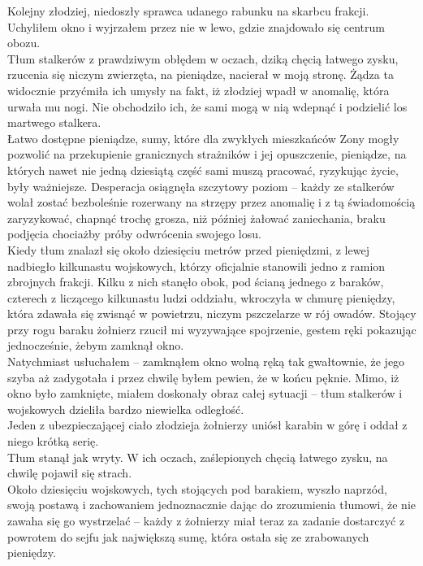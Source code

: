 \documentclass[../MAIN.tex]{subfiles}
\begin{document}
Kolejny złodziej, niedoszły sprawca udanego rabunku na skarbcu frakcji.\\
Uchyliłem okno i wyjrzałem przez nie w lewo, gdzie znajdowało się centrum obozu.\\
Tłum stalkerów z prawdziwym obłędem w oczach, dziką chęcią łatwego zysku, rzucenia się niczym zwierzęta, na pieniądze, nacierał w moją stronę. Żądza ta widocznie przyćmiła ich umysły na fakt, iż złodziej wpadł w anomalię, która urwała mu nogi. Nie obchodziło ich, że sami mogą w nią wdepnąć i podzielić los martwego stalkera.\\
Łatwo dostępne pieniądze, sumy, które dla zwykłych mieszkańców Zony mogły pozwolić na przekupienie granicznych strażników i jej opuszczenie, pieniądze, na których nawet nie jedną dziesiątą część sami muszą pracować, ryzykując życie, były ważniejsze. Desperacja osiągnęła szczytowy poziom -- każdy ze stalkerów wolał zostać bezboleśnie rozerwany na strzępy przez anomalię i z tą świadomością zaryzykować, chapnąć trochę grosza, niż później żałować zaniechania, braku podjęcia chociażby próby odwrócenia swojego losu.\\
Kiedy tłum znalazł się około dziesięciu metrów przed pieniędzmi, z lewej nadbiegło kilkunastu wojskowych, którzy oficjalnie stanowili jedno z ramion zbrojnych frakcji. Kilku z nich stanęło obok, pod ścianą jednego z baraków, czterech z liczącego kilkunastu ludzi oddziału, wkroczyła w chmurę pieniędzy, która zdawała się zwisnąć w powietrzu, niczym pszczelarze w rój owadów. Stojący przy rogu baraku żołnierz rzucił mi wyzywające spojrzenie, gestem ręki pokazując jednocześnie, żebym zamknął okno.\\
Natychmiast usłuchałem -- zamknąłem okno wolną ręką tak gwałtownie, że jego szyba aż zadygotała i przez chwilę byłem pewien, że w końcu pęknie. Mimo, iż okno było zamknięte, miałem doskonały obraz całej sytuacji -- tłum stalkerów i wojskowych dzieliła bardzo niewielka odległość.\\
Jeden z ubezpieczającej ciało złodzieja żołnierzy uniósł karabin w górę i oddał z niego krótką serię.\\
Tłum stanął jak wryty. W ich oczach, zaślepionych chęcią łatwego zysku, na chwilę pojawił się strach.\\
Około dziesięciu wojskowych, tych stojących pod barakiem, wyszło naprzód, swoją postawą i zachowaniem jednoznacznie dając do zrozumienia tłumowi, że nie zawaha się go wystrzelać -- każdy z żołnierzy miał teraz za zadanie dostarczyć z powrotem do sejfu jak największą sumę, która ostała się ze zrabowanych pieniędzy.\\
\end{document}

